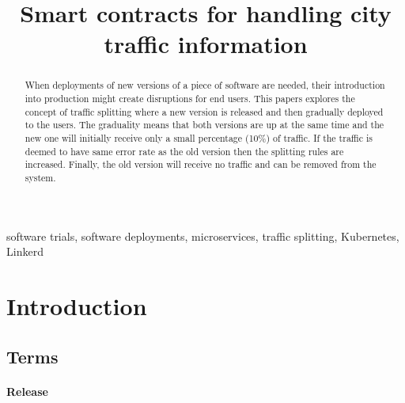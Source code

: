 \documentclass[conference]{IEEEtran}
\begin{document}
\title{Smart contracts for handling city traffic information}

\author{
    \and
}

\maketitle

\begin{abstract}
    When deployments of new versions of a piece of software are needed, their introduction into production might create disruptions for end users. This papers explores the concept of traffic splitting where a new version is released and then gradually deployed to the users. The graduality means that both versions are up at the same time and the new one will initially receive only a small percentage (10\%) of traffic. If the traffic is deemed to have same error rate as the old version then the splitting rules are increased. Finally, the old version will receive no traffic and can be removed from the system.
\end{abstract}

\begin{IEEEkeywords}
    software trials, software deployments, microservices, traffic splitting, Kubernetes, Linkerd
\end{IEEEkeywords}

\section{Introduction}

\subsection{Terms}
\paragraph{Release}
\end{document}
